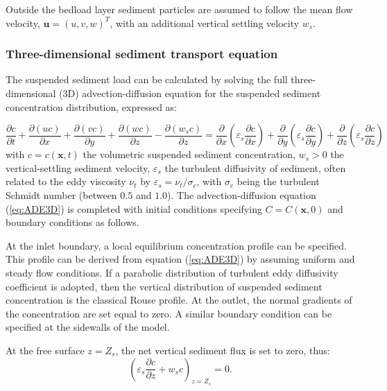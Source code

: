 Outside the bedload layer sediment particles are assumed to follow the mean
flow velocity, $\mathbf{u} = (u,v,w)^T$, with an additional vertical
settling velocity $w_s$. 

\subsubsection{Three-dimensional sediment transport equation}
The suspended sediment load can be calculated by solving the full three-dimensional (3D) advection-diffusion equation for the suspended sediment concentration distribution, expressed as:

\begin{equation}\label{eq:ADE3D}
\frac{\partial c}{\partial t} + \frac{\partial(u c)}{\partial x} + \frac{\partial(v c)}{\partial y} + \frac{\partial(w c)}{\partial z} - \frac{\partial(w_s c)}{\partial z} = \frac{\partial}{\partial x}\left(\varepsilon_s\frac{\partial c}{\partial x}\right) + 
                                           \frac{\partial}{\partial y}\left(\varepsilon_s\frac{\partial c}{\partial y}\right) +
                                           \frac{\partial}{\partial z}\left(\varepsilon_s\frac{\partial c}{\partial z}\right) 
\end{equation}
with $c=c(\mathbf x,t)$ the volumetric suspended sediment concentration, $w_s > 0$ the vertical-settling sediment velocity, $\varepsilon_s$ the turbulent diffusivity of sediment, often related to the eddy viscosity $\nu_t$ by $\varepsilon_s=\nu_t/\sigma_c$, with $\sigma_c$ being the turbulent Schmidt number (between $0.5$ and $1.0$). The advection-diffusion equation (\ref{eq:ADE3D}) is completed with initial conditions specifying $C=C(\mathbf x,0)$ and boundary conditions as follows. 

At the inlet boundary, a local equilibrium concentration profile can be specified. This profile can be derived from equation (\ref{eq:ADE3D}) by assuming uniform and steady flow conditions. If a parabolic distribution of turbulent eddy diffusivity coefficient is adopted, then the vertical distribution of suspended sediment concentration is the classical Rouse profile.
At the outlet, the normal gradients of the concentration are set equal to zero. A similar boundary condition can be specified at the sidewalls of the model. 

At the free surface $z=Z_s$, the net vertical sediment flux is set to zero, thus:
\begin{equation*}
\left(\varepsilon_s\frac{\partial c}{\partial z} + w_s c\right)_{z=Z_s} = 0.
\end{equation*}

